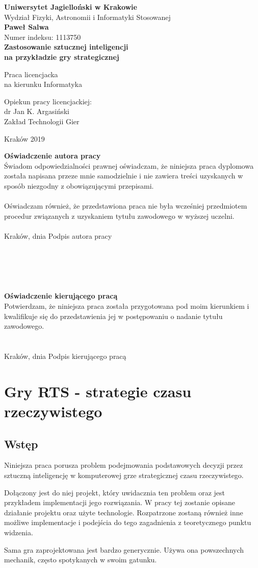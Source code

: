 \documentclass[12pt]{report}
\newcommand\blankpage{%
    \null
    \thispagestyle{empty}%
    \addtocounter{page}{-1}%
    \newpage}
\renewcommand{\maketitle}{

\begin{titlepage}
\begin{spacing}{1.0}
\begin{center}
\textbf{{\large Uniwersytet Jagielloński w Krakowie}}\\[0.5cm]
{\large Wydział Fizyki, Astronomii i Informatyki Stosowanej}\\[4cm]	
\textbf{{\Large Paweł Salwa}}\\[0.5cm]
{\normalsize Numer indeksu: 1113750}\\[2cm]
\textbf{{\LARGE 
Zastosowanie sztucznej inteligencji\\
na przykładzie gry strategicznej\\[.4cm]
}}

{\normalsize Praca licencjacka\\
na kierunku Informatyka}\\[4cm]
\begin{flushright}
{\normalsize Opiekun pracy licencjackiej:\\
dr Jan K. Argasiński\\
Zakład Technologii Gier}\\[1.0cm]
\end{flushright}
Kraków 2019
\end{center}
\end{spacing}

\thispagestyle{empty}
\noindent 

\pagebreak

\textbf{Oświadczenie autora pracy}\\
 
{\small 
\noindent
Świadom odpowiedzialności prawnej oświadczam, że niniejsza praca dyplomowa została napisana przeze mnie samodzielnie i nie zawiera treści uzyskanych w sposób niezgodny z obowiązującymi przepisami.\\
\\
\noindent
Oświadczam również, że przedstawiona praca nie była wcześniej przedmiotem procedur związanych z uzyskaniem tytułu zawodowego w wyższej uczelni.\\
\\
\noindent
Kraków, dnia \hfill Podpis autora pracy}\\
\\
\\
\\
\\
\\
\noindent 
\textbf{Oświadczenie kierującego pracą}\\

{\small
\noindent
Potwierdzam, że niniejsza praca została przygotowana pod moim kierunkiem i kwalifikuje się do przedstawienia jej w postępowaniu o nadanie tytułu zawodowego.\\
\\
\\
\noindent
Kraków, dnia \hfill Podpis kierującego pracą}
\thispagestyle{empty}


\end{titlepage}
}
\begin{document}
\maketitle
\tableofcontents
\chapter {Gry RTS - strategie czasu rzeczywistego}


\section {Wstęp}
Niniejsza praca porusza problem podejmowania podstawowych decyzji przez sztuczną inteligencję w komputerowej grze strategicznej czasu rzeczywistego. 

Dołączony jest do niej projekt, który uwidacznia ten problem oraz jest przykładem implementacji jego rozwiązania. W pracy tej zostanie opisane działanie projektu oraz użyte technologie. Rozpatrzone zostaną również inne możliwe implementacje i podejścia do tego zagadnienia z teoretycznego punktu widzenia.

Sama gra zaprojektowana jest bardzo generycznie. Używa ona powszechnych mechanik, często spotykanych w swoim gatunku.
\end{document}
